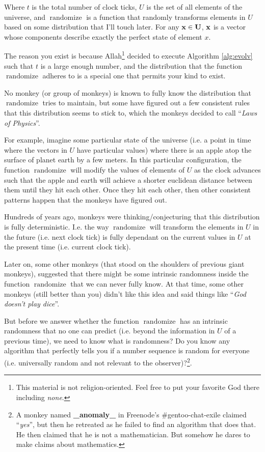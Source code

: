 \documentclass{report}
\DeclareMathOperator{\randomize}{randomize}
\begin{document}
Where $t$ is the total number of clock ticks, $U$ is the set of all elements of
the universe, and $\randomize$ is a function that randomly transforms elements
in $U$ based on some distribution that I'll touch later. For any $\bf{x} \in
U$, $\bf{x}$ is a vector whose components describe exactly the perfect state of
element $x$.

The reason you exist is because Allah\footnote{This material is not
religion-oriented. Feel free to put your favorite God there including
\emph{none}.} decided to execute Algorithm \ref{alg:evolv} such that $t$ is a
large enough number, and the distribution that the function $\randomize$
adheres to is a special one that permits your kind to exist.

No monkey (or group of monkeys) is known to fully know the distribution that
$\randomize$ tries to maintain, but some have figured out a few consistent
rules that this distribution seems to stick to, which the monkeys decided to
call ``\emph{Laws of Physics}''.

For example, imagine some particular state of the universe (i.e. a point in
time where the vectors in $U$ have particular values) where there is an apple
atop the surface of planet earth by a few meters. In this particular
configuration, the function $\randomize$ will modify the values of elements of
$U$ as the clock advances such that the apple and earth will achieve a shorter
euclidean distance between them until they hit each other. Once they hit each
other, then other consistent patterns happen that the monkeys have figured out.

Hundreds of years ago, monkeys were thinking/conjecturing that
this distribution is fully deterministic. I.e. the way $\randomize$ will
transform the elements in $U$ in the future (i.e. next clock tick) is fully
dependant on the current values in $U$ at the present time (i.e. current clock
tick).

Later on, some other monkeys (that stood on the shoulders of previous giant
monkeys), suggested that there might be some intrinsic randomness inside the
function $\randomize$ that we can never fully know. At that time, some other
monkeys (still better than you) didn't like this idea and said things like
``\emph{God doesn't play dice}''.

But before we answer whether the function $\randomize$ has an intrinsic
randomness that no one can predict (i.e. beyond the information in $U$ of a
previous time), we need to know what is randomness? Do you know any algorithm
that perfectly tells you if a number sequence is random for everyone (i.e.
universally random and not relevant to the observer)?\footnote{A monkey named
\textbf{\_anomaly\_} in Freenode's \#gentoo-chat-exile claimed ``\emph{yes}'',
but then he retreated as he failed to find an algorithm that does that. He then
claimed that he is not a mathematician. But somehow he dares to make claims
about mathematics.}.
\end{document}
